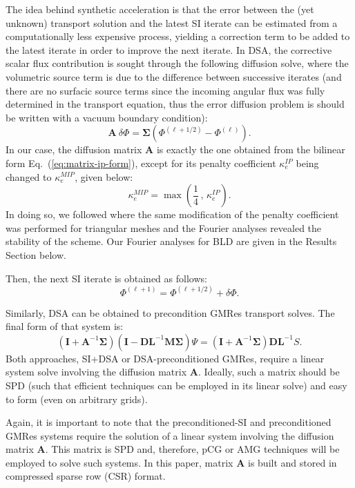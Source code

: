 \documentclass{mc2013}
\newcommand\bs{\boldsymbol}
\renewcommand{\(}{\left(}
\renewcommand{\)}{\right)}
\renewcommand{\[}{\left[}
\renewcommand{\]}{\right]}
\newcommand{\eqt}[1]{Eq.~(\ref{#1})}                     %
\begin{document}
The idea behind synthetic acceleration is that the error between the (yet
unknown) transport solution and the latest SI iterate can be estimated from a
computationally less expensive process, yielding a correction term to be added
to the latest iterate in order to improve the next iterate. In DSA, the
corrective scalar flux contribution is sought through the following
diffusion solve, where the volumetric source term is due to the difference between
successive iterates (and there are no surfacic source terms since the incoming angular flux was
fully determined in the transport equation, thus the error diffusion problem is should 
be written with a vacuum boundary condition):
\begin{equation}
  \bs{A}\ \delta \Phi = \bs{\Sigma}\(\Phi^{(\ell+1/2)} - \Phi^{(\ell)}\).
\end{equation}
In our case, the diffusion matrix $\bs{A}$ is exactly the one obtained from the bilinear form \eqt{eq:matrix-ip-form},
except for its penalty coefficient $\kappa_e^{IP}$ being changed to $\kappa_e^{MIP}$, given below: 
\begin{equation}
\kappa_e^{MIP} = \max \( \frac{1}{4}\, , \, \kappa_e^{IP} \) .
\end{equation}
In doing so, we followed \cite{mip} where the same modification of the penalty coefficient was performed 
for triangular meshes and the Fourier analyses revealed the stability of the scheme. 
Our Fourier analyses for BLD are given in the Results Section below.

Then, the next SI iterate is obtained as follows:
\begin{equation}
  \Phi^{(\ell+1)} = \Phi^{(\ell+1/2)}+\delta \Phi.
\end{equation}

Similarly, DSA can be obtained to precondition GMRes transport solves. The
final form of that system is:
\begin{equation}
  \(\bs{I} +\bs{A}^{-1} \bs{\Sigma}\)\(\bs{I}-\bs{DL}^{-1}\bs{M\Sigma}\) \Psi
  = \(\bs{I}+\bs{A}^{-1}\bs{\Sigma}\) \bs{DL}^{-1} S.
\end{equation}
Both approaches, SI+DSA or DSA-preconditioned GMRes, require a linear system
solve involving the diffusion matrix $\bs{A}$. Ideally, such a matrix should
be SPD (such that efficient techniques can be employed in its linear solve)
and easy to form (even on arbitrary grids).

Again, it is important to note that the preconditioned-SI and preconditioned GMRes systems 
require the solution of a linear system involving the diffusion matrix $\bs{A}$. This matrix is 
SPD and, therefore, pCG or AMG techniques will be employed to solve such systems. In this paper,
matrix $\bs{A}$ is built and stored in compressed sparse row (CSR) format.
\end{document}
